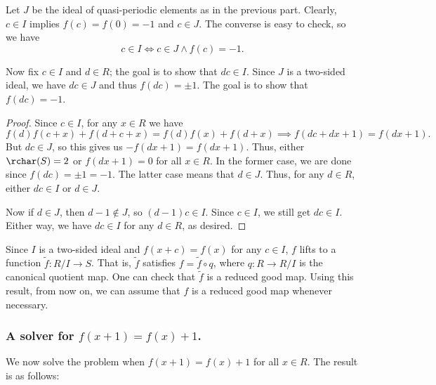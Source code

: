 Let $J$ be the ideal of quasi-periodic elements as in the previous part.
Clearly, $c \in I$ implies $f(c) = f(0) = -1$ and $c \in J$.
The converse is easy to check, so we have
\[ c \in I \iff c \in J \wedge f(c) = -1. \]

Now fix $c \in I$ and $d \in R$; the goal is to show that $dc \in I$.
Since $J$ is a two-sided ideal, we have $dc \in J$ and thus $f(dc) = \pm 1$.
The goal is to show that $f(dc) = -1$.

\begin{proof}
Since $c \in I$, for any $x \in R$ we have
\[ f(d) f(c + x) + f(d + c + x) = f(d) f(x) + f(d + x) \implies f(dc + dx + 1) = f(dx + 1). \]
But $dc \in J$, so this gives us $-f(dx + 1) = f(dx + 1)$.
Thus, either $\rchar(S) = 2$ or $f(dx + 1) = 0$ for all $x \in R$.
In the former case, we are done since $f(dc) = \pm 1 = -1$.
The latter case means that $d \in J$.
Thus, for any $d \in R$, either $dc \in I$ or $d \in J$.

Now if $d \in J$, then $d - 1 \notin J$, so $(d - 1)c \in I$.
Since $c \in I$, we still get $dc \in I$.
Either way, we have $dc \in I$ for any $d \in R$, as desired.
\end{proof}

Since $I$ is a two-sided ideal and $f(x + c) = f(x)$ for any $c \in I$, $f$ lifts to a function $\tilde{f} : R/I \to S$.
That is, $\tilde{f}$ satisfies $f = \tilde{f} \circ q$, where $q : R \to R/I$ is the canonical quotient map.
One can check that $\tilde{f}$ is a reduced good map.
Using this result, from now on, we can assume that $f$ is a reduced good map whenever necessary.



\subsubsection*{A solver for $f(x + 1) = f(x) + 1$.}

We now solve the problem when $f(x + 1) = f(x) + 1$ for all $x \in R$.
The result is as follows:

